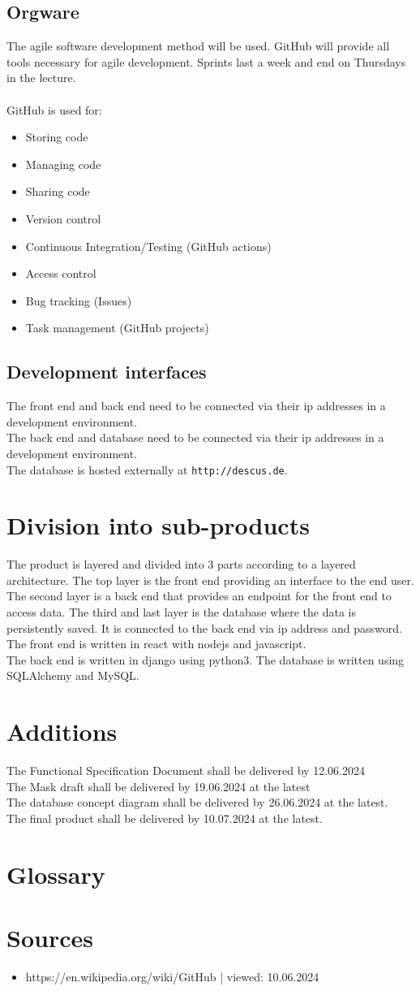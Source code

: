 \documentclass[]{article}
\begin{document}
	\subsection{Orgware}
		The agile software development method will be used. GitHub will provide all tools necessary for agile development. Sprints last a week and end on Thursdays in the lecture.\\
		\\
		GitHub is used for:
		\begin{itemize}
			\item Storing code
			\item Managing code
			\item Sharing code
			\item Version control
			\item Continuous Integration/Testing (GitHub actions)
			\item Access control
			\item Bug tracking (Issues)
			\item Task management (GitHub projects)
		\end{itemize}
	\subsection{Development interfaces}
		The front end and back end need to be connected via their ip addresses in a development environment.\\
		The back end and database need to be connected via their ip addresses in a development environment.\\
		The database is hosted externally at \texttt{http://descus.de}.
\section{Division into sub-products}
	The product is layered and divided into 3 parts according to a layered architecture. The top layer is the front end providing an interface to the end user. The second layer is a back end that provides an endpoint for the front end to access data. The third and last layer is the database where the data is persistently saved. It is connected to the back end via ip address and password.\\
	The front end is written in react with nodejs and javascript.\\
	The back end is written in django using python3.
	The database is written using SQLAlchemy and MySQL.
\section{Additions}
	The Functional Specification Document shall be delivered by 12.06.2024\\
	The Mask draft shall be delivered by 19.06.2024 at the latest\\
	The database concept diagram shall be delivered by 26.06.2024 at the latest.\\
	The final product shall be delivered by 10.07.2024 at the latest.
\section{Glossary}
\section{Sources}
	\begin{itemize}
		\item https://en.wikipedia.org/wiki/GitHub | viewed: 10.06.2024
	\end{itemize}
\end{document}
